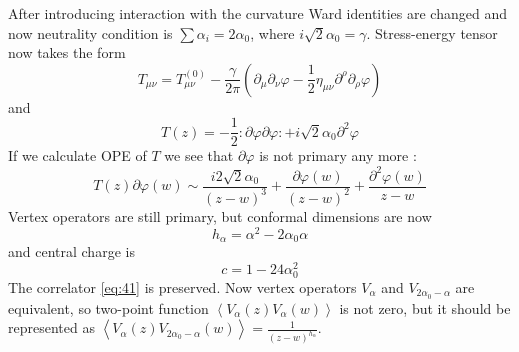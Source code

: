 \documentclass[12pt]{article}
\begin{document}
After introducing interaction with the curvature Ward identities are changed and now neutrality
condition is $\sum \alpha_{i}=2\alpha_{0}$, where $i\sqrt{2}\alpha_{0}=\gamma$. 
Stress-energy tensor now takes the form
\begin{equation}
  \label{eq:45}
  T_{\mu\nu}=T^{(0)}_{\mu\nu}-\frac{\gamma}{2\pi}\left(\partial_{\mu}\partial_{\nu}\varphi-\frac{1}{2}\eta_{\mu\nu}\partial^{\rho}\partial_{\rho}\varphi\right)
\end{equation}
and
\begin{equation}
  \label{eq:46}
  T(z)=-\frac{1}{2}:\partial \varphi\partial\varphi:+i\sqrt{2}\alpha_{0}\partial^{2}\varphi
\end{equation}
If we calculate OPE of $T$ we see that $\partial\varphi$ is not primary any more \cite{difrancesco1997cft}:
\begin{equation}
  \label{eq:47}
  T(z)\partial\varphi(w)\sim
  \frac{i2\sqrt{2}\alpha_{0}}{(z-w)^{3}}+\frac{\partial\varphi(w)}{(z-w)^{2}} +\frac{\partial^{2}\varphi(w)}{z-w}
\end{equation}
Vertex operators are still primary, but conformal dimensions are now
\begin{equation}
  \label{eq:48}
  h_{\alpha}=\alpha^{2}-2\alpha_{0}\alpha
\end{equation}
and central charge is
\begin{equation}
  \label{eq:49}
  c=1-24\alpha_{0}^{2}
\end{equation}
The correlator \eqref{eq:41} is preserved. Now vertex operators $V_{\alpha}$ and
$V_{2\alpha_{0}-\alpha}$ are equivalent, so two-point function
$\left<V_{\alpha}(z)V_{\alpha}(w)\right>$  is not zero, but it should be represented as
$\left<V_{\alpha}(z)V_{2\alpha_{0}-\alpha}(w)\right>=\frac{1}{(z-w)^{h_{\alpha}}}$. 
\end{document}

